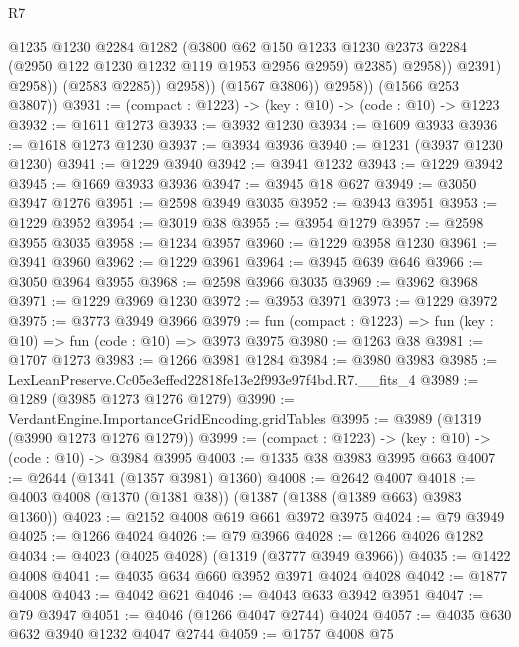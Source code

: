 \begin{lexlean}{R7}
\begin{coremodule}
                            @1235
                            @1230
                            @2284
                            @1282
                            (@3800
                              @62
                              @150
                              @1233
                              @1230
                              @2373
                              @2284
                              (@2950 @122 @1230 @1232 @119 @1953 @2956 @2959)
                              @2385)
                            @2958))
                        @2391)
                      @2958))
                  (@2583 @2285))
                @2958))
            (@1567 @3806))
          @2958))
      (@1566 @253 @3807))
@3931 := (compact : @1223) -> (key : @10) -> (code : @10) -> @1223
@3932 := @1611 @1273
@3933 := @3932 @1230
@3934 := @1609 @3933
@3936 := @1618 @1273 @1230
@3937 := @3934 @3936
@3940 := @1231 (@3937 @1230 @1230)
@3941 := @1229 @3940
@3942 := @3941 @1232
@3943 := @1229 @3942
@3945 := @1669 @3933 @3936
@3947 := @3945 @18 @627
@3949 := @3050 @3947 @1276
@3951 := @2598 @3949 @3035
@3952 := @3943 @3951
@3953 := @1229 @3952
@3954 := @3019 @38
@3955 := @3954 @1279
@3957 := @2598 @3955 @3035
@3958 := @1234 @3957
@3960 := @1229 @3958 @1230
@3961 := @3941 @3960
@3962 := @1229 @3961
@3964 := @3945 @639 @646
@3966 := @3050 @3964 @3955
@3968 := @2598 @3966 @3035
@3969 := @3962 @3968
@3971 := @1229 @3969 @1230
@3972 := @3953 @3971
@3973 := @1229 @3972
@3975 := @3773 @3949 @3966
@3979 := fun (compact : @1223) => fun (key : @10) => fun (code : @10) => @3973 @3975
@3980 := @1263 @38
@3981 := @1707 @1273
@3983 := @1266 @3981 @1284
@3984 := @3980 @3983
@3985 := LexLeanPreserve.Cc05e3effed22818fe13e2f993e97f4bd.R7.__fits_4
@3989 := @1289 (@3985 @1273 @1276 @1279)
@3990 := VerdantEngine.ImportanceGridEncoding.gridTables
@3995 := @3989 (@1319 (@3990 @1273 @1276 @1279))
@3999 := (compact : @1223) -> (key : @10) -> (code : @10) -> @3984 @3995
@4003 := @1335 @38 @3983 @3995 @663
@4007 := @2644 (@1341 (@1357 @3981) @1360)
@4008 := @2642 @4007
@4018 := @4003 @4008 (@1370 (@1381 @38)) (@1387 (@1388 (@1389 @663) @3983 @1360))
@4023 := @2152 @4008 @619 @661 @3972 @3975
@4024 := @79 @3949
@4025 := @1266 @4024
@4026 := @79 @3966
@4028 := @1266 @4026 @1282
@4034 := @4023 (@4025 @4028) (@1319 (@3777 @3949 @3966))
@4035 := @1422 @4008
@4041 := @4035 @634 @660 @3952 @3971 @4024 @4028
@4042 := @1877 @4008
@4043 := @4042 @621
@4046 := @4043 @633 @3942 @3951
@4047 := @79 @3947
@4051 := @4046 (@1266 @4047 @2744) @4024
@4057 := @4035 @630 @632 @3940 @1232 @4047 @2744
@4059 := @1757 @4008 @75

\end{coremodule}
\end{lexlean}

